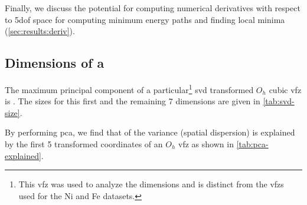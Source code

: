 \documentclass[final,twocolumn,12pt]{elsarticle}
\begin{document}
	Finally, we discuss the potential for computing numerical derivatives with respect to \gls{5dof} space for computing minimum energy paths and finding local minima (\cref{sec:results:deriv}).
	
	
	\subsection{Dimensions of a } \label{sec:results:dimensions}
	
	The maximum principal component of a particular\footnote{This \gls{vfz} was used to analyze the dimensions and is distinct from the \glspl{vfz} used for the Ni and Fe datasets.} \gls{svd} transformed $O_h$ cubic \gls{vfz} is \dimOne{}. The sizes for this first and the remaining 7 dimensions are given in \cref{tab:svd-size}.
	
	\begin{table}[!htb]
	    \centering
    	    \caption{Dimension of \gls{svd} transformed coordinates (Dimension) and \gls{gbo} dimension size ($d_{\Omega}$) for a set of \num{20000} \glspl{vfzgbo}. These are the diagonal entries of the "S" matrix in the \gls{svd} decomposition. }
    	    \label{tab:svd-size}
	\end{table}
	By performing \gls{pca}, we find that \percExplained{} of the variance (spatial dispersion) is explained by the first 5 transformed coordinates of an $O_h$ \gls{vfz} as shown in \cref{tab:pca-explained}.
	
	\begin{table}[!htb]
	    \centering
    	    \caption{Dimension of \gls{pca} transformed coordinates (Dimension) and percent variance explained ($v$) for a set of \num{50000} \glspl{vfzgbo}. The first 5 dimensions cumulatively explain \percExplained{} of the variance. }
    	    \label{tab:pca-explained}
	\end{table}	
	
\end{document}
